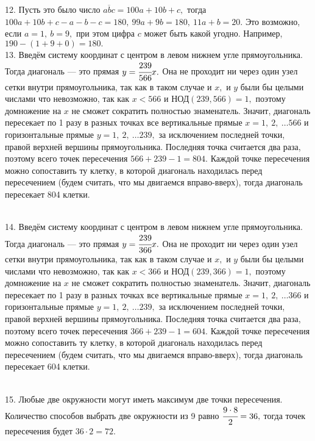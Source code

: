 12. Пусть это было число $\overline{abc}=100a+10b+c,$ тогда $100a+10b+c-a-b-c=180,\ 99a+9b=180,\ 11a+b=20.$ Это возможно, если $a=1,\ b=9,$ при этом цифра $c$ может быть какой угодно. Например, $190-(1+9+0)=180.$\\
13. Введём систему координат с центром в левом нижнем угле прямоугольника. Тогда диагональ --- это прямая $y=\cfrac{239}{566}x.$ Она не проходит ни через один узел сетки внутри прямоугольника, так как в таком случае и $x,$ и $y$ были бы целыми числами что невозможно, так как $x<566$ и $\text{НОД}(239,566)=1,$ поэтому домножение на $x$ не сможет сократить полностью знаменатель. Значит, диагональ пересекает по 1 разу в разных точках все вертикальные прямые $x=1,\ 2,\ \ldots 566$ и горизонтальные прямые $y=1,\ 2,\ \ldots 239,$ за исключением последней точки, правой верхней вершины прямоугольника. Последняя точка считается два раза, поэтому всего точек пересечения $566+239-1=804.$ Каждой точке пересечения можно сопоставить ту клетку, в которой диагональ находилась перед пересечением (будем считать, что мы двигаемся вправо-вверх), тогда диагональ пересекает 804 клетки.
\begin{figure}[ht!]
\end{figure}\\
14. Введём систему координат с центром в левом нижнем угле прямоугольника. Тогда диагональ --- это прямая $y=\cfrac{239}{366}x.$ Она не проходит ни через один узел сетки внутри прямоугольника, так как в таком случае и $x,$ и $y$ были бы целыми числами что невозможно, так как $x<366$ и $\text{НОД}(239,366)=1,$ поэтому домножение на $x$ не сможет сократить полностью знаменатель. Значит, диагональ пересекает по 1 разу в разных точках все вертикальные прямые $x=1,\ 2,\ \ldots 366$ и горизонтальные прямые $y=1,\ 2,\ \ldots 239,$ за исключением последней точки, правой верхней вершины прямоугольника. Последняя точка считается два раза, поэтому всего точек пересечения $366+239-1=604.$ Каждой точке пересечения можно сопоставить ту клетку, в которой диагональ находилась перед пересечением (будем считать, что мы двигаемся вправо-вверх), тогда диагональ пересекает 604 клетки.
\begin{figure}[ht!]
\end{figure}\\
15. Любые две окружности могут иметь максимум две точки пересечения. Количество способов выбрать две окружности из 9 равно $\cfrac{9\cdot8}{2}=36,$ тогда точек пересечения будет $36\cdot2=72.$\\
